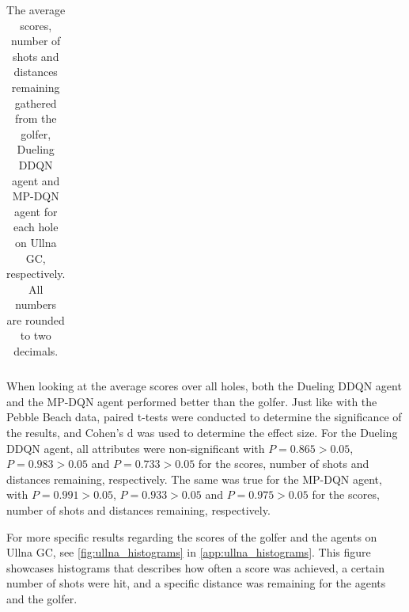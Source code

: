 \documentclass{kththesis}
\begin{document}
\begin{table}
\begin{subtable}{0.3\textwidth}
{\begin{tabular}{|c|c|c|c|c|}
    \end{tabular}
    }
    \end{subtable}
    \hfill
    \begin{subtable}{0.3\textwidth}
    \centering
    \end{subtable}
    \caption{The average scores, number of shots and distances remaining gathered from the golfer, Dueling DDQN agent and MP-DQN agent for each hole on Ullna GC, respectively. All numbers are rounded to two decimals.}
    \label{tab:ullna_average_results}
\end{table}

When looking at the average scores over all holes, both the Dueling DDQN agent and the MP-DQN agent performed better than the golfer. Just like with the Pebble Beach data, paired t-tests were conducted to determine the significance of the results, and Cohen's d was used to determine the effect size. For the Dueling DDQN agent, all attributes were non-significant with $P = 0.865 > 0.05$, $P = 0.983 > 0.05$ and $P = 0.733 > 0.05$ for the scores, number of shots and distances remaining, respectively. The same was true for the MP-DQN agent, with $P = 0.991 > 0.05$, $P = 0.933 > 0.05$ and $P = 0.975 > 0.05$ for the scores, number of shots and distances remaining, respectively.

For more specific results regarding the scores of the golfer and the agents on Ullna GC, see \autoref{fig:ullna_histograms} in \autoref{app:ullna_histograms}. This figure showcases histograms that describes how often a score was achieved, a certain number of shots were hit, and a specific distance was remaining for the agents and the golfer.
\end{document}

